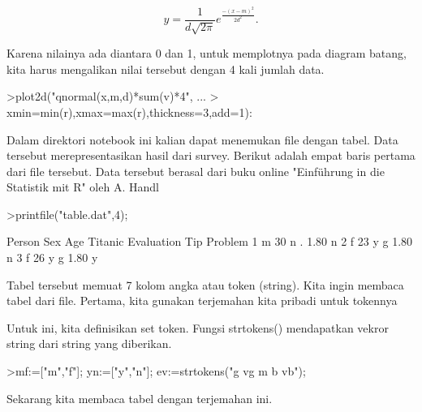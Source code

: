 \documentclass{article}
\begin{document}
\begin{eulernotebook}
\begin{eulercomment}
\end{eulercomment}
\begin{eulerformula}
\[
y=\frac{1}{d\sqrt{2\pi}}e^{\frac{-(x-m)^2}{2d^2}}.
\]
\end{eulerformula}
\begin{eulercomment}
Karena nilainya ada diantara 0 dan 1, untuk memplotnya pada diagram
batang, kita harus mengalikan nilai tersebut dengan 4 kali jumlah
data.
\end{eulercomment}
\begin{eulerprompt}
>plot2d("qnormal(x,m,d)*sum(v)*4", ...
>  xmin=min(r),xmax=max(r),thickness=3,add=1):
\end{eulerprompt}
\begin{eulercomment}
Dalam direktori notebook ini kalian dapat menemukan file dengan tabel.
Data tersebut merepresentasikan hasil dari survey. Berikut adalah
empat baris pertama dari file tersebut. Data tersebut berasal dari
buku online "Einführung in die Statistik mit R" oleh A. Handl
\end{eulercomment}
\begin{eulerprompt}
>printfile("table.dat",4);
\end{eulerprompt}
\begin{euleroutput}
  Person Sex Age Titanic Evaluation Tip Problem
  1 m 30 n . 1.80 n
  2 f 23 y g 1.80 n
  3 f 26 y g 1.80 y
\end{euleroutput}
\begin{eulercomment}
Tabel tersebut memuat 7 kolom angka atau token (string). Kita ingin
membaca tabel dari file. Pertama, kita gunakan terjemahan kita pribadi
untuk tokennya

Untuk ini, kita definisikan set token. Fungsi strtokens() mendapatkan
vekror string dari string yang diberikan.
\end{eulercomment}
\begin{eulerprompt}
>mf:=["m","f"]; yn:=["y","n"]; ev:=strtokens("g vg m b vb");
\end{eulerprompt}
\begin{eulercomment}
Sekarang kita membaca tabel dengan terjemahan ini.



\end{eulercomment}
\end{eulernotebook}
\end{document}
